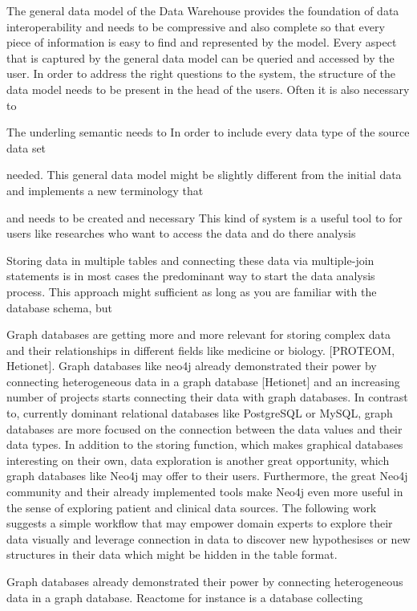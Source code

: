 The general data model of the Data Warehouse provides the foundation of data interoperability and needs to be compressive and also complete so that every piece of information is easy to find and represented by the model. Every aspect that is captured by the general data model can be queried and accessed by the user. In order to address the right questions to the system, the structure of the data model needs to be present in the head of the users. Often it is also necessary to  



The underling semantic needs to In order to include every data type of the source data set

needed. This general data model might be slightly different from the initial data and implements a new terminology that 

 and needs to be created and necessary This kind of system is a useful tool to for users like researches who want to access the data and do there analysis 

Storing data in multiple tables and connecting these data via multiple-join statements is in most cases the predominant way to start the data analysis process. This approach might sufficient as long as you are familiar with the database schema, but 

Graph databases are getting more and more relevant for storing complex data and their relationships in different fields like medicine or biology. [PROTEOM, Hetionet]. Graph databases like neo4j already demonstrated their power by connecting heterogeneous data in a graph database [Hetionet] and an increasing number of projects starts connecting their data with graph databases. 
In contrast to, currently dominant relational databases like PostgreSQL or MySQL, graph databases are more focused on the connection between the data values and their data types. In addition to the storing function, which makes graphical databases interesting on their own, data exploration is another great opportunity, which graph databases like Neo4j may offer to their users. Furthermore, the great Neo4j community and their already implemented tools make Neo4j even more useful in the sense of exploring patient and clinical data sources. The following work suggests a simple workflow that may empower domain experts to explore their data visually and leverage connection in data to discover new hypothesises or new structures in their data which might be hidden in the table format.


Graph databases already demonstrated their power by connecting heterogeneous data in a graph database. Reactome for instance is a database collecting 

